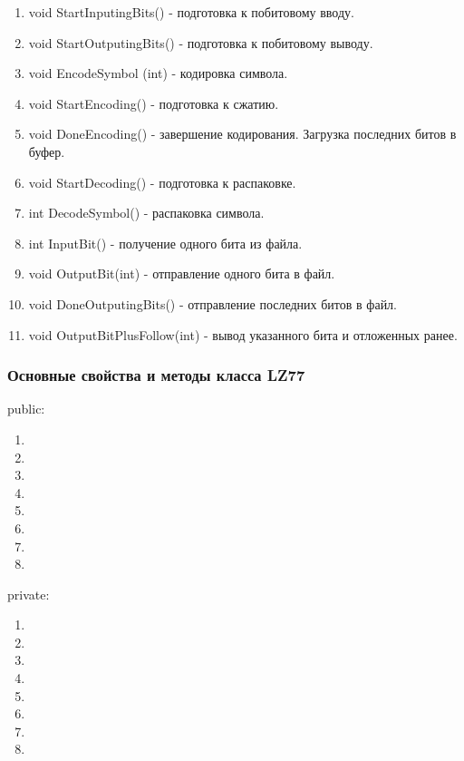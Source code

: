 \documentclass[12pt]{article}
\begin{document}
\begin{enumerate}
	\item void StartInputingBits() - подготовка к побитовому вводу.
	\item void StartOutputingBits() - подготовка к побитовому выводу.
	\item void EncodeSymbol (int) - кодировка символа.
	\item void StartEncoding() - подготовка к сжатию.
	\item void DoneEncoding() - завершение кодирования. Загрузка последних битов в буфер.
	\item void StartDecoding() - подготовка к распаковке.
	\item int DecodeSymbol() - распаковка символа.
	\item int InputBit() - получение одного бита из файла.
	\item void OutputBit(int) - отправление одного бита в файл.
	\item void DoneOutputingBits() - отправление последних битов в файл.
	\item void OutputBitPlusFollow(int) - вывод указанного бита и отложенных ранее.
\end{enumerate}

\subsubsection*{Основные свойства и методы класса LZ77}%
\noindent
public:

\begin{enumerate}
	\item 
	\item 
	\item 
	\item 
	\item 
	\item 
	\item 
	\item 
\end{enumerate}
\noindent
private:

\begin{enumerate}
	\item 
	\item 
	\item 
	\item 
	\item 
	\item 
	\item 
	\item 
\end{enumerate}
\end{document}
